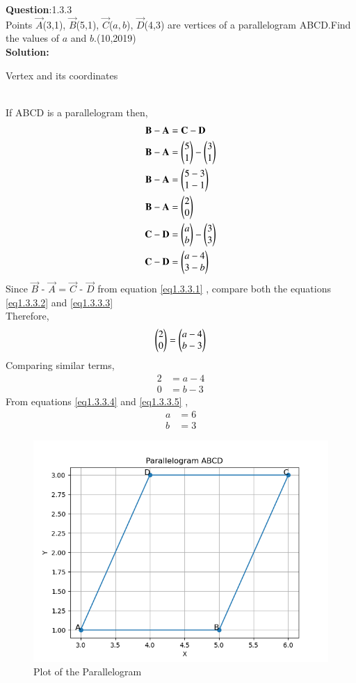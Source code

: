 \documentclass[journal]{IEEEtran}
\begin{document}
\textbf{Question}:1.3.3\\
Points $\vec{A}$(3,1), $\vec{B}$(5,1), $\vec{C}$($a,b$), $\vec{D}$(4,3) are vertices of a parallelogram ABCD.Find the values of $a$ and $b$.\hfill(10,2019)
\\
\textbf{Solution:}
\renewcommand{\tablename}{Table 1.3.3.1}
\begin{table}[h!]
  \centering
  
  \caption{Vertex and its coordinates}
\end{table}\\
 If ABCD is a parallelogram then,
 \begin{align}
	 \mathbf{B} - \mathbf{A} & = \mathbf{C} - \mathbf{D} \label{eq1.3.3.1} \\
	 \mathbf{B} - \mathbf{A} & = \begin{pmatrix}5 \\ 1\end{pmatrix} - \begin{pmatrix}3 \\ 1\end{pmatrix} \\
	 \mathbf{B} - \mathbf{A} & = \begin{pmatrix}5 - 3 \\ 1 - 1\end{pmatrix}\\
	 \mathbf{B} - \mathbf{A} & = \begin{pmatrix}2 \\ 0\end{pmatrix} \label{eq1.3.3.2} \\
	 \mathbf{C} - \mathbf{D} & = \begin{pmatrix}a \\ b\end{pmatrix} - \begin{pmatrix}3 \\ 3\end{pmatrix} \\
	 \mathbf{C} - \mathbf{D} & = \begin{pmatrix}a - 4 \\ 3 - b\end{pmatrix} \label{eq1.3.3.3} \\
     \end{align}
Since  $\vec{B}$ - $\vec{A}$ = $\vec{C}$ - $\vec{D}$ from equation              \ref{eq1.3.3.1} , compare both the equations \ref{eq1.3.3.2} and \ref{eq1.3.3.3} \\
Therefore,
\begin{align}
	\begin{pmatrix}2 \\ 0\end{pmatrix} & = \begin{pmatrix}a - 4 \\ b - 3\end{pmatrix} \\
\end{align}
Comparing similar terms,
\begin{align}
	2 & = a - 4 \label{eq1.3.3.4} \\
	0 & = b - 3 \label{eq1.3.3.5}
\end{align}
From equations \ref{eq1.3.3.4} and \ref{eq1.3.3.5} , \\
\begin{align}
	a & = 6 \\
	b & = 3
    \end{align}
    \begin{figure}[h!]
	    \centering
	    \includegraphics[width=0.7\linewidth]{figs/pgm.png}
	    \caption{Plot of the Parallelogram}
    \end{figure}
    
\end{document}
